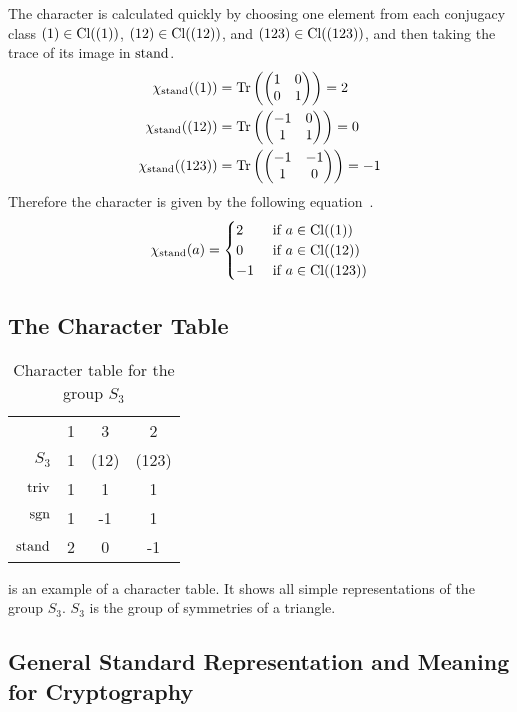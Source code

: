 The character is calculated quickly by choosing one element from each conjugacy class $(1) \in \operatorname{Cl}((1))$, $(12) \in \operatorname{Cl}((12))$, and $(123) \in \operatorname{Cl}((123))$, and then taking the trace of its image in $\operatorname{stand}$.
\begin{subequations}
\begin{align}
    \chi_{\operatorname{stand}}((1)) & = \operatorname{Tr}\left( \begin{pmatrix}
        1 & 0 \\
        0 & 1
    \end{pmatrix} \right) = 2 \\
    \chi_{\operatorname{stand}}((12)) & = \operatorname{Tr}\left( \begin{pmatrix}
        -1 & 0 \\
        1 & 1
    \end{pmatrix} \right) = 0 \\
    \chi_{\operatorname{stand}}((123)) & = \operatorname{Tr}\left( \begin{pmatrix}
        -1 & -1 \\
        1 & 0
    \end{pmatrix} \right) = -1
\end{align}
\end{subequations}
Therefore the character is given by the following equation~\cite{fulton2013}.
\begin{align}
    \chi_{\operatorname{stand}}(a) = \begin{cases}
        2 & \text{ if } a \in \operatorname{Cl}((1)) \\
        0 & \text{ if } a \in \operatorname{Cl}((12)) \\
        -1 & \text{ if } a \in \operatorname{Cl}((123))
    \end{cases}
\end{align}

\subsection{The Character Table}


\begin{table}
    \centering

    \begin{tabular}{r | c  c  c}
                    & 1 & 3     & 2     \\
        $S_3$       & 1 & (12)  & (123) \\ \hline
        $\operatorname{triv}$     & 1 & 1     & 1     \\
        $\operatorname{sgn}$      & 1 & -1    & 1     \\
        $\operatorname{stand}$    & 2 & 0     & -1
    \end{tabular}

    \caption{Character table for the group $S_3$}
    \label{tab:reprep.char.table}
\end{table}

 is an example of a character table.
It shows all simple representations of the group $S_3$.
$S_3$ is the group of symmetries of a triangle.

\subsection{General Standard Representation and Meaning for Cryptography}
